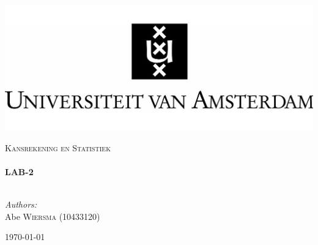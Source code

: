 \begin{titlepage}

\begin{flushleft}
\includegraphics[trim=23mm 0mm 0mm 0mm, width=1\textwidth]{./logo.jpg}\\[1cm] \end{flushleft}
\begin{center}
	\textsc{\Large Kansrekening en Statistiek}\\[0.5cm]

    \HRule \\[0.4cm] { \huge \bfseries LAB-2}\\[0.4cm]

    \HRule \\[1.5cm]

\begin{minipage}{0.4\textwidth}
\begin{flushleft} \large \emph{Authors:}\\
Abe \textsc{Wiersma} (10433120)\\
\end{flushleft}
\end{minipage}
\begin{minipage}{0.4\textwidth} \begin{flushright} \large \end{flushright}\end{minipage}

    \vfill

    {\large \today}

\end{center}
\end{titlepage}
\pagebreak